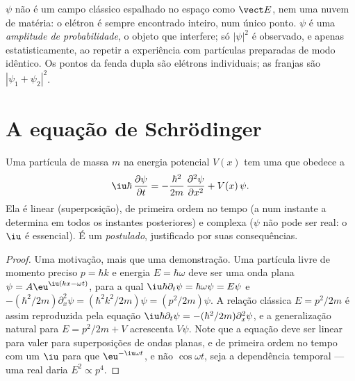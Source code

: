 \begin{remark}\label{rem:b2:schrodinger-wave-functions:not}
$\psi$ não é um campo clássico espalhado no espaço como $\vect E$, nem uma
nuvem de matéria: o elétron é sempre encontrado inteiro, num único ponto.
$\psi$ é uma \emph{amplitude de probabilidade}, o objeto que
interfere; só $|\psi|^2$ é observado, e apenas estatisticamente, ao
repetir a experiência com partículas preparadas de modo idêntico. Os pontos
da fenda dupla são elétrons individuais; as franjas são $|\psi_1 +
\psi_2|^2$.
\end{remark}

\section{A equação de Schrödinger}

\begin{theorem}\label{thm:b2:schrodinger-wave-functions:equation}
Uma partícula de massa $m$ na energia potencial $V(x)$ tem uma  que obedece a
\[
\iu\hbar\,\frac{\partial\psi}{\partial t} = -\frac{\hbar^2}{2m}\,\frac{\partial^2\psi}{\partial x^2} + V(x)\,\psi .
\]
Ela é linear (superposição), de primeira ordem no tempo (a 
num instante a determina em todos os instantes posteriores) e complexa ($\psi$
não pode ser real: o $\iu$ é essencial). É um \emph{postulado},
justificado por suas consequências.
\end{theorem}

\begin{proof}
Uma motivação, mais que uma demonstração. Uma partícula livre de momento preciso
$p = \hbar k$ e energia $E = \hbar\omega$ deve ser uma onda plana $\psi =
A\eu^{\iu(kx - \omega t)}$, para a qual $\iu\hbar\partial_t\psi = \hbar\omega\psi =
E\psi$ e $-(\hbar^2/2m)\partial_x^2\psi = (\hbar^2k^2/2m)\psi = (p^2/2m)\psi$.
A relação clássica $E = p^2/2m$ é assim reproduzida pela equação
$\iu\hbar\partial_t\psi = -(\hbar^2/2m)\partial_x^2\psi$, e a generalização
natural para $E = p^2/2m + V$ acrescenta $V\psi$. Note que a
equação deve ser linear para valer para superposições de ondas planas, e
de primeira ordem no tempo com um $\iu$ para que $\eu^{-\iu\omega t}$, e não
$\cos\omega t$, seja a dependência temporal --- uma  real
daria $E^2 \propto p^4$.
\end{proof}

